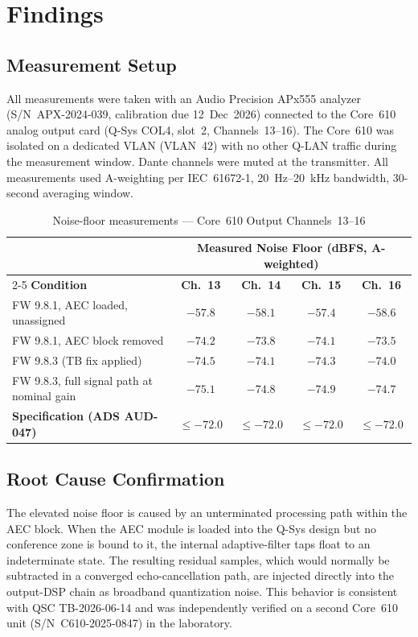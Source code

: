 \section{Findings}

\subsection{Measurement Setup}

All measurements were taken with an Audio Precision APx555 analyzer
(S/N~APX-2024-039, calibration due 12~Dec~2026) connected to the Core~610
analog output card (Q-Sys COL4, slot~2, Channels~13--16). The Core~610 was
isolated on a dedicated VLAN (VLAN~42) with no other Q-LAN traffic during the
measurement window. Dante channels were muted at the transmitter. All
measurements used A-weighting per IEC~61672-1, 20~Hz--20~kHz bandwidth,
30-second averaging window.

\begin{table}[H]
\centering
\caption{Noise-floor measurements --- Core~610 Output Channels~13--16}
\medskip
\begin{tabular}{@{}lcccc@{}}
\toprule
& \multicolumn{4}{c}{\textbf{Measured Noise Floor (dBFS, A-weighted)}} \\
\cmidrule(lr){2-5}
\textbf{Condition} & \textbf{Ch.\ 13} & \textbf{Ch.\ 14} & \textbf{Ch.\ 15} & \textbf{Ch.\ 16} \\
\midrule
FW 9.8.1, AEC loaded, unassigned                          & $-57.8$ & $-58.1$ & $-57.4$ & $-58.6$ \\
FW 9.8.1, AEC block removed                               & $-74.2$ & $-73.8$ & $-74.1$ & $-73.5$ \\
\rowcolor{rowstripe}FW 9.8.3 (TB fix applied)             & $-74.5$ & $-74.1$ & $-74.3$ & $-74.0$ \\
FW 9.8.3, full signal path at nominal gain                & $-75.1$ & $-74.8$ & $-74.9$ & $-74.7$ \\
\midrule
\rowcolor{palebg}\textbf{Specification (ADS AUD-047)}   & $\leq -72.0$ & $\leq -72.0$ & $\leq -72.0$ & $\leq -72.0$ \\
\bottomrule
\end{tabular}
\end{table}

\subsection{Root Cause Confirmation}

The elevated noise floor is caused by an unterminated processing path within the
AEC block. When the AEC module is loaded into the Q-Sys design but no conference
zone is bound to it, the internal adaptive-filter taps float to an
indeterminate state. The resulting residual samples, which would normally be
subtracted in a converged echo-cancellation path, are injected directly into the
output-DSP chain as broadband quantization noise. This behavior is consistent
with QSC TB-2026-06-14 and was independently verified on a second Core~610 unit
(S/N~C610-2025-0847) in the laboratory.

